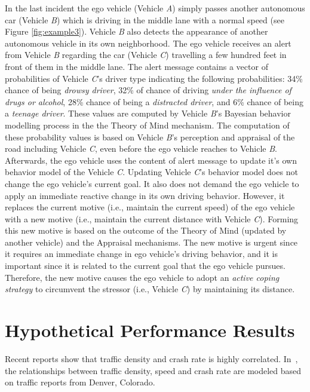 \documentclass[journal, 11pt]{IEEEtran}
\begin{document}
In the last incident the ego vehicle (Vehicle \textit{A}) simply passes another
autonomous car (Vehicle \textit{B}) which is driving in the middle lane with a
normal speed (see Figure \ref{fig:example3}). Vehicle \textit{B} also detects
the appearance of another autonomous vehicle in its own neighborhood. The ego
vehicle receives an alert from Vehicle \textit{B} regarding the car (Vehicle
\textit{C}) travelling a few hundred feet in front of them in the middle lane.
The alert message contains a vector of probabilities of Vehicle \textit{C}'s
driver type indicating the following probabilities: 34\% chance of being
\textit{drowsy driver}, 32\% of chance of driving \textit{under the influence of
drugs or alcohol}, 28\% chance of being a \textit{distracted driver}, and 6\%
chance of being a \textit{teenage driver}. These values are computed by 
Vehicle \textit{B}'s Bayesian behavior modelling process in the the Theory of
Mind mechanism. The computation of these probability values is based on Vehicle
\textit{B}'s perception and appraisal of the road including Vehicle \textit{C},
even before the ego vehicle reaches to Vehicle \textit{B}. Afterwards, the ego
vehicle uses the content of alert message to update it's own behavior model
of the Vehicle \textit{C}. Updating Vehicle \textit{C}'s behavior model does not
change the ego vehicle's current goal. It also does not demand the ego vehicle
to apply an immediate reactive change in its own driving behavior. However, it
replaces the current motive (i.e., maintain the current speed) of the ego
vehicle with a new motive (i.e., maintain the current distance with Vehicle
\textit{C}). Forming this new motive is based on the outcome of the Theory of
Mind (updated by another vehicle) and the Appraisal mechanisms. The new motive
is urgent since it requires an immediate change in ego vehicle's driving
behavior, and it is important since it is related to the current goal that the
ego vehicle pursues. Therefore, the new motive causes the ego vehicle to adopt
an \textit{active coping strategy} to circumvent the stressor (i.e., Vehicle
\textit{C}) by maintaining its distance.

\section{Hypothetical Performance Results}

Recent reports show that traffic density and crash rate is highly correlated.
In~\cite{trb12}, the relationships between traffic density, speed and crash rate
are modeled based on traffic reports from Denver, Colorado. 
\end{document}
